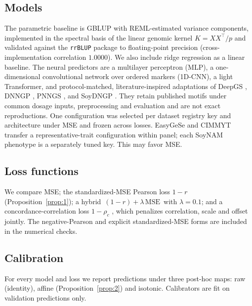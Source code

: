 \documentclass[9pt,twocolumn,twoside,lineno]{gsag3jnl}
\theoremstyle{plain}
\theoremstyle{remark}
\begin{document}
\subsection{Models}
The parametric baseline is GBLUP with REML-estimated variance
components, implemented in the spectral basis of the linear genomic kernel
$K=XX^\top/p$ and validated against the \texttt{rrBLUP} package
\citep{endelman2011} to floating-point precision (cross-implementation
correlation $1.0000$). We also include ridge regression as a linear baseline. The neural predictors
are a multilayer perceptron (MLP), a one-dimensional convolutional network over
ordered markers (1D-CNN), a light Transformer, and protocol-matched,
literature-inspired adaptations of DeepGS \citep{ma2018deepgs}, DNNGP
\citep{wang2023dnngp}, PNNGS \citep{pnngs2024}, and SoyDNGP
\citep{gao2023soydngp}. They retain published motifs under common dosage inputs,
preprocessing and evaluation and are not exact reproductions. One configuration
was selected per dataset registry key and architecture under MSE and frozen
across losses. EasyGeSe and CIMMYT transfer a representative-trait configuration
within panel; each SoyNAM phenotype is a separately tuned key. This may favor MSE.

\subsection{Loss functions}
We compare MSE; the standardized-MSE Pearson loss
$1-r$ (Proposition~\ref{prop:1}); a hybrid $\,(1-r)+\lambda\,\mathrm{MSE}\,$ with
$\lambda=0.1$; and a concordance-correlation loss $1-\rho_c$ \citep{lin1989},
which penalizes correlation, scale and offset jointly. The negative-Pearson and
explicit standardized-MSE forms are included in the numerical checks.

\subsection{Calibration}
For every model and loss we report predictions under
three post-hoc maps: raw (identity), affine (Proposition~\ref{prop:2}) and
isotonic. Calibrators are fit on validation predictions only.
\end{document}
